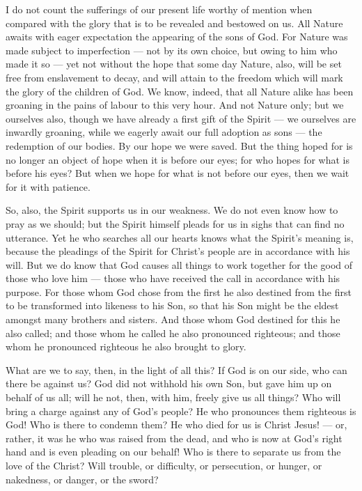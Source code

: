  I do not count the sufferings of our present life worthy
of mention when compared with the glory that is to be revealed and
bestowed on us.  All Nature awaits with eager expectation
the appearing of the sons of God.  For Nature was made
subject to imperfection --- not by its own choice, but owing to him who
made it so ---  yet not without the hope that some day
Nature, also, will be set free from enslavement to decay, and will
attain to the freedom which will mark the glory of the children of God.
 We know, indeed, that all Nature alike has been groaning
in the pains of labour to this very hour.  And not Nature
only; but we ourselves also, though we have already a first gift of the
Spirit --- we ourselves are inwardly groaning, while we eagerly await
our full adoption as sons --- the redemption of our bodies.
 By our hope we were saved. But the thing hoped for is no
longer an object of hope when it is before our eyes; for who hopes for
what is before his eyes?  But when we hope for what is not
before our eyes, then we wait for it with patience.

 So, also, the Spirit supports us in our weakness. We do
not even know how to pray as we should; but the Spirit himself pleads
for us in sighs that can find no utterance.  Yet he who
searches all our hearts knows what the Spirit's meaning is, because the
pleadings of the Spirit for Christ's people are in accordance with his
will.  But we do know that God causes all things to work
together for the good of those who love him --- those who have received
the call in accordance with his purpose.  For those whom
God chose from the first he also destined from the first to be
transformed into likeness to his Son, so that his Son might be the
eldest amongst many brothers and sisters.  And those whom
God destined for this he also called; and those whom he called he also
pronounced righteous; and those whom he pronounced righteous he also
brought to glory.

 What are we to say, then, in the light of all this? If God
is on our side, who can there be against us?  God did not
withhold his own Son, but gave him up on behalf of us all; will he not,
then, with him, freely give us all things?  Who will bring
a charge against any of God's people? He who pronounces them righteous
is God!  Who is there to condemn them? He who died for us
is Christ Jesus! --- or, rather, it was he who was raised from the dead,
and who is now at God's right hand and is even pleading on our behalf!
 Who is there to separate us from the love of the Christ?
Will trouble, or difficulty, or persecution, or hunger, or nakedness, or
danger, or the sword?

